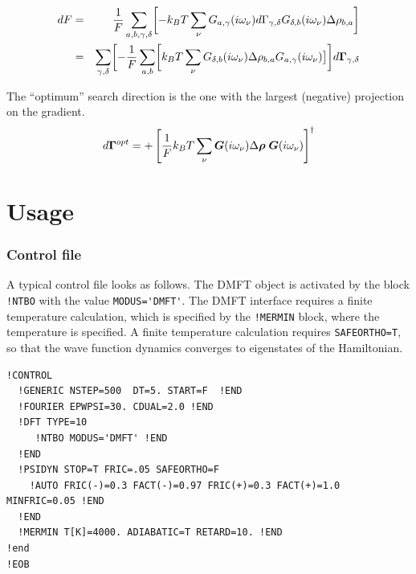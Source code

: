 \documentclass[11pt,a4paper]{report}
\begin{document}
\begin{eqnarray}
dF
&=&\frac{1}{F}\sum_{a,b,\gamma,\delta} 
\biggl[-k_BT
\sum_\nu G_{a,\gamma}(i\omega_\nu)d\Gamma_{\gamma,\delta}
G_{\delta,b}(i\omega_\nu)
 \Delta\rho_{b,a}  \biggr]
\nonumber\\
&=&\sum_{\gamma,\delta} \biggl[-\frac{1}{F}\sum_{a,b} 
\biggl[k_BT\sum_\nu
G_{\delta,b}(i\omega_\nu) \Delta\rho_{b,a}
G_{a,\gamma}(i\omega_\nu)\bigr]
       \biggr]d\bm{\Gamma}_{\gamma,\delta}
\end{eqnarray}


The ``optimum'' search direction is the one with the largest (negative)
projection on the gradient.
\begin{eqnarray}
d\bm{\Gamma}^{opt}=+\left[\frac{1}{F}k_BT\sum_\nu
\bm{G}(i\omega_\nu) \Delta\bm{\rho}\;\bm{G}(i\omega_\nu)\right]^\dagger
\end{eqnarray}


\chapter{Usage}
\subsection{Control file}
A typical control file looks as follows. The DMFT object is activated
by the block \verb|!NTBO| with the value \verb|MODUS='DMFT'|. The DMFT
interface requires a finite temperature calculation, which is
specified by the \verb|!MERMIN| block, where the temperature is
specified.  A finite temperature calculation requires
\verb|SAFEORTHO=T|, so that the wave function dynamics converges to
eigenstates of the Hamiltonian.
\begin{verbatim}
!CONTROL
  !GENERIC NSTEP=500  DT=5. START=F  !END 
  !FOURIER EPWPSI=30. CDUAL=2.0 !END
  !DFT TYPE=10  
     !NTBO MODUS='DMFT' !END   
  !END 
  !PSIDYN STOP=T FRIC=.05 SAFEORTHO=F
    !AUTO FRIC(-)=0.3 FACT(-)=0.97 FRIC(+)=0.3 FACT(+)=1.0 MINFRIC=0.05 !END
  !END
  !MERMIN T[K]=4000. ADIABATIC=T RETARD=10. !END
!end
!EOB
\end{verbatim}

\end{document}
